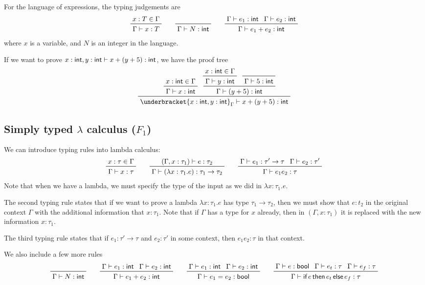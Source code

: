 \documentclass[class=scrartcl]{standalone}
\begin{document}
\begin{example}
  For the language of expressions, the typing judgements are
  \[
    \prftree{x : T \in \Gamma}
            {\Gamma \vdash x : T} \qquad
    \prfaxiom{\Gamma \vdash N : \pint} \qquad
    \prftree{\Gamma \vdash e_1 : \pint}
            {\Gamma \vdash e_2 : \pint}
            {\Gamma \vdash e_1 + e_2 : \pint}
  \]
  where \(x\) is a variable, and \(N\) is an integer in the language.

  If we want to prove \(x : \textsf{int}, y : \textsf{int} \vdash
                        x + (y + 5) : \textsf{int}\),
  we have the proof tree
  \[
    \prftree{\prftree{x : \pint \in \Gamma}
                     {\Gamma \vdash x : \pint}}
            {\prftree{\prftree{x : \pint \in \Gamma}
                              {\Gamma \vdash y : \pint}}
                     {\prfaxiom{\Gamma \vdash 5 : \pint}}
                     {\Gamma \vdash (y + 5) : \pint}}
            {\underbracket{x : \pint, y : \pint}_\Gamma
             \vdash x + (y + 5) : \pint}
  \]
\end{example}

\subsection{Simply typed \texorpdfstring{\(\lambda\)}{lambda}
            calculus (\texorpdfstring{\(F_1\)}{F1})}
We can introduce typing rules into lambda calculus:
\[
  \prftree{x : \tau \in \Gamma}
          {\Gamma \vdash x : \tau} \qquad
  \prftree{(\Gamma, x : \tau_1) \vdash e : \tau_2}
          {\Gamma \vdash (\lambda x: \tau_1. e) : \tau_1 \to \tau_2} \qquad
  \prftree{\Gamma \vdash e_1 : \tau' \to \tau}
          {\Gamma \vdash e_2 : \tau'}
          {\Gamma \vdash e_1 e_2 : \tau}
\]
Note that when we have a lambda, we must specify the type of the input
as we did in \(\lambda x : \tau_1. e\).

The second typing rule states that if we want to prove
a lambda \(\lambda x : \tau_1. e\) has type \(\tau_1 \to \tau_2\),
then we must show that \(e : t_2\) in the original context \(\Gamma\)
with the additional information that \(x : \tau_1\).
Note that if \(\Gamma\) has a type for \(x\) already,
then in \((\Gamma, x : \tau_1)\) it is replaced with
the new information \(x : \tau_1\).

The third typing rule states that
if \(e_1 : \tau' \to \tau\) and \(e_2 : \tau'\) in some context,
then \(e_1 e_2 : \tau\) in that context.

We also include a few more rules
\[
  \prfaxiom{\Gamma \vdash N : \pint} \qquad
  \prftree{\Gamma \vdash e_1 : \pint}
          {\Gamma \vdash e_2 : \pint}
          {\Gamma \vdash e_1 + e_2 : \pint} \qquad
  \prftree{\Gamma \vdash e_1 : \pint}
          {\Gamma \vdash e_2 : \pint}
          {\Gamma \vdash e_1 = e_2 : \pbool} \qquad
  \prftree{\Gamma \vdash e : \pbool}
          {\Gamma \vdash e_t : \tau}
          {\Gamma \vdash e_f : \tau}
          {\Gamma \vdash \pifthenelse{e}{e_t}{e_f} : \tau}
\]
\end{document}
